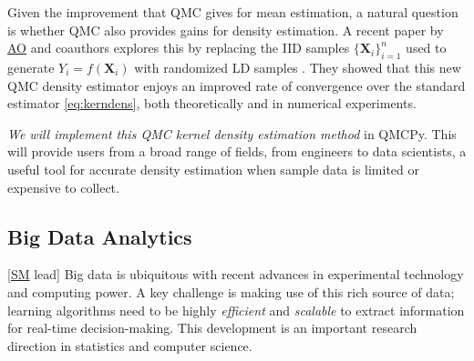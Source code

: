 \documentclass[11pt]{NSFamsart}
\newcommand{\SM}{\hyperlink{SMlink}{SM}\xspace}
\newcommand{\AO}{\hyperlink{AOlink}{AO}\xspace}
\newcommand{\LlAJR}{\hyperlink{LlAJRlink}{LlAJR}\xspace}
\newcommand{\bX}{{\boldsymbol{X}}}
\begin{document}
Given the improvement that QMC gives for mean estimation, a natural question is whether QMC also provides gains for density estimation. A recent paper \cite{abdellah2018density} by \AO and coauthors explores this by replacing the IID samples $\{\bX_i\}_{i=1}^n$ used to generate $Y_i = f(\bX_i)$ with randomized LD samples \cite{owen2000monte}. They showed that this new QMC density estimator enjoys an improved rate of convergence over the standard estimator \eqref{eq:kerndens}, both theoretically and in numerical experiments.

\textit{We will implement this QMC kernel density estimation method} in QMCPy. This will provide users from a broad range of fields, from engineers to data scientists, a useful tool for accurate density estimation when sample data is limited or expensive to collect.

\fi

\subsection{Big Data Analytics} [\SM lead] Big data is ubiquitous with recent advances in experimental technology and computing power.  A key challenge is making use of this rich source of data; learning algorithms need to be highly \textit{efficient} and \textit{scalable} to extract information for real-time decision-making. This development is an important research direction in statistics and computer science.
\end{document}
